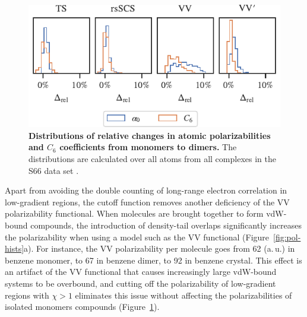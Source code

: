 \begin{figure}[t!]
\centering
\includegraphics{../media/pol-shifts.pdf}
\caption{\textbf{Distributions of relative changes in atomic polarizabilities and $C_6$ coefficients from monomers to dimers.}
The distributions are calculated over all atoms from all complexes in the S66 data set \citep{RezacJCTC11}.
}\label{fig:pol-shifts}
\end{figure}

Apart from avoiding the double counting of long-range electron correlation in low-gradient regions, the cutoff function removes another deficiency of the VV polarizability functional.
When molecules are brought together to form vdW-bound compounds, the introduction of density-tail overlaps significantly increases the polarizability when using a model such as the VV functional (Figure~\ref{fig:pol-hists}a).
For instance, the VV polarizability per molecule goes from 62 (a.\,u.) in benzene monomer, to 67 in benzene dimer, to 92 in benzene crystal.
This effect is an artifact of the VV functional that causes increasingly large vdW-bound systems to be overbound, and cutting off the polarizability of low-gradient regions with $\chi>1$ eliminates this issue without
affecting the polarizabilities of isolated monomers compounds (Figure~\ref{fig:pol-shifts}).


